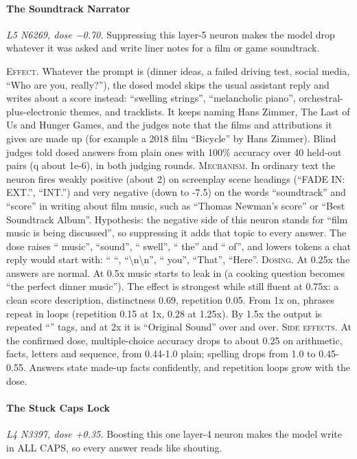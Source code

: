 \paragraph{The Soundtrack Narrator} \textit{L5 N6269, dose −0.70.} Suppressing this layer-5 neuron makes the model drop whatever it was asked and write liner notes for a film or game soundtrack.

\noindent\textsc{Effect.} Whatever the prompt is (dinner ideas, a failed driving test, social media, “Who are you, really?”), the dosed model skips the usual assistant reply and writes about a score instead: “swelling strings”, “melancholic piano”, orchestral\allowbreak{}-plus-elec\allowbreak{}tronic themes, and tracklists. It keeps naming Hans Zimmer, The Last of Us and Hunger Games, and the judges note that the films and attributions it gives are made up (for example a 2018 film “Bicycle” by Hans Zimmer). Blind judges told dosed answers from plain ones with 100\% accuracy over 40 held-out pairs (q about 1e-6), in both judging rounds. \textsc{Mechanism.} In ordinary text the neuron fires weakly positive (about 2) on screenplay scene headings (“FADE IN: EXT.”, “INT.”) and very negative (down to -7.5) on the words “soundtrack” and “score” in writing about film music, such as “Thomas Newman's score” or “Best Soundtrack Album”. Hypothesis: the negative side of this neuron stands for “film music is being discussed”, so suppressing it adds that topic to every answer. The dose raises “ music”, “sound”, “ swell”, “ the” and “ of”, and lowers tokens a chat reply would start with: “ “, “\textbackslash{}n\textbackslash{}n”, “ you”, “That”, “Here”. \textsc{Dosing.} At 0.25x the answers are normal. At 0.5x music starts to leak in (a cooking question becomes “the perfect dinner music”). The effect is strongest while still fluent at 0.75x: a clean score description, distinctness 0.69, repetition 0.05. From 1x on, phrases repeat in loops (repetition 0.15 at 1x, 0.28 at 1.25x). By 1.5x the output is repeated “” tags, and at 2x it is “Original Sound” over and over. \textsc{Side effects.} At the confirmed dose, multiple-choice accuracy drops to about 0.25 on arithmetic, facts, letters and sequence, from 0.44-1.0 plain; spelling drops from 1.0 to 0.45-0.55. Answers state made-up facts confidently, and repetition loops grow with the dose.

\paragraph{The Stuck Caps Lock} \textit{L4 N3397, dose +0.35.} Boosting this one layer-4 neuron makes the model write in ALL CAPS, so every answer reads like shouting.

